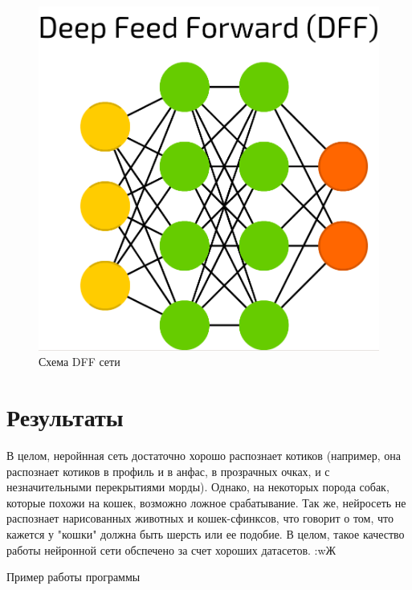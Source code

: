 \documentclass{article}
\begin{document}
\begin{figure}[h!]
    \centering
    \includegraphics[scale=0.1]{model.png}
    \caption{Схема DFF сети}
    \label{fig:model}
\end{figure}

\section{Результаты}

В целом, неройнная сеть достаточно хорошо распознает котиков (например, она распознает котиков в профиль и в анфас, в прозрачных очках, и с незначительными перекрытиями морды). Однако, на некоторых порода собак, которые похожи на кошек, возможно ложное срабатывание. Так же, нейросеть не распознает нарисованных животных и кошек-сфинксов, что говорит о том, что кажется у "кошки" должна быть шерсть или ее подобие. В целом, такое качество работы нейронной сети обспечено за счет хороших датасетов. :wЖ

Пример работы программы
\end{document}
